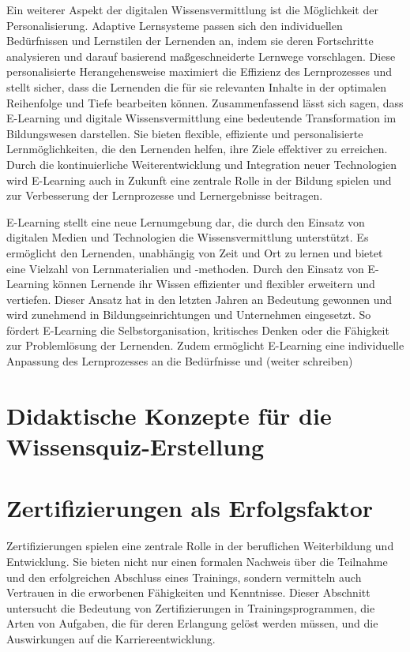 Ein weiterer Aspekt der digitalen Wissensvermittlung ist die Möglichkeit der Personalisierung. Adaptive Lernsysteme passen sich den individuellen Bedürfnissen und Lernstilen der Lernenden an, indem sie deren Fortschritte analysieren und darauf basierend maßgeschneiderte Lernwege vorschlagen. Diese personalisierte Herangehensweise maximiert die Effizienz des Lernprozesses und stellt sicher, dass die Lernenden die für sie relevanten Inhalte in der optimalen Reihenfolge und Tiefe bearbeiten können.
Zusammenfassend lässt sich sagen, dass E-Learning und digitale Wissensvermittlung eine bedeutende Transformation im Bildungswesen darstellen. Sie bieten flexible, effiziente und personalisierte Lernmöglichkeiten, die den Lernenden helfen, ihre Ziele effektiver zu erreichen. Durch die kontinuierliche Weiterentwicklung und Integration neuer Technologien wird E-Learning auch in Zukunft eine zentrale Rolle in der Bildung spielen und zur Verbesserung der Lernprozesse und Lernergebnisse beitragen.

E-Learning stellt eine neue Lernumgebung dar, die durch den Einsatz von digitalen Medien und 
Technologien die Wissensvermittlung unterstützt. Es ermöglicht den Lernenden, unabhängig von Zeit und 
Ort zu lernen und bietet eine Vielzahl von Lernmaterialien und -methoden. %
Durch den Einsatz von E-Learning können Lernende ihr Wissen effizienter und flexibler erweitern und vertiefen. %
Dieser Ansatz hat in den letzten Jahren an Bedeutung gewonnen und wird zunehmend in 
Bildungseinrichtungen und Unternehmen eingesetzt. So fördert E-Learning die Selbstorganisation, kritisches
Denken oder die Fähigkeit zur Problemlösung der Lernenden. 
Zudem ermöglicht E-Learning eine individuelle Anpassung des Lernprozesses an die Bedürfnisse und (weiter schreiben)

\section{Didaktische Konzepte für die Wissensquiz-Erstellung}

\section{Zertifizierungen als Erfolgsfaktor}
Zertifizierungen spielen eine zentrale Rolle in der beruflichen Weiterbildung und Entwicklung. Sie bieten nicht nur einen formalen Nachweis über die Teilnahme und den erfolgreichen Abschluss eines Trainings, sondern vermitteln auch Vertrauen in die erworbenen Fähigkeiten und Kenntnisse. Dieser Abschnitt untersucht die Bedeutung von Zertifizierungen in Trainingsprogrammen, die Arten von Aufgaben, die für deren Erlangung gelöst werden müssen, und die Auswirkungen auf die Karriereentwicklung. %

